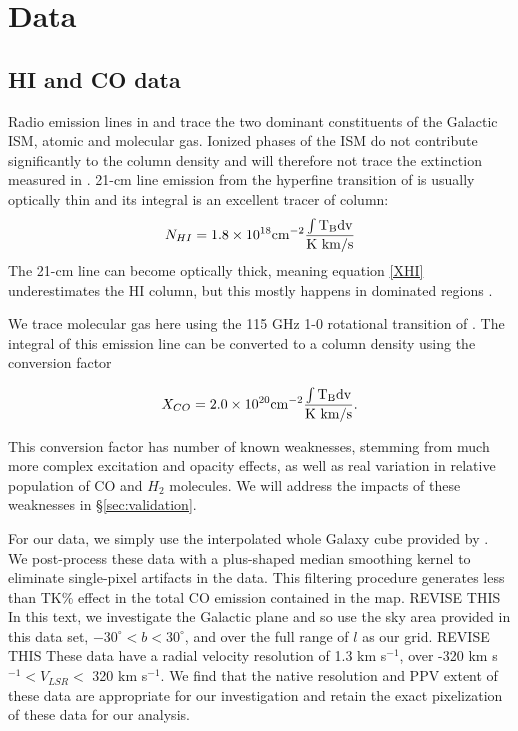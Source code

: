 \section{Data}
\label{sec:data}
\subsection{HI and CO data}

Radio emission lines in \atomHI and \CO trace the two dominant constituents of the Galactic ISM, atomic and molecular gas. Ionized phases of the ISM do not contribute significantly to the column density and will therefore not trace the extinction measured in \cite{Green_2015}. 21-cm line emission from the hyperfine transition of \atomHI is usually optically thin and its integral is an excellent tracer of \atomHI column:
\begin{equation}\label{XHI}
N_{HI} = 1.8 \times 10^{18} \rm cm^{-2} \frac{ \int T_B dv}{\rm K~km/s}
\end{equation}
The 21-cm line can become optically thick, meaning equation \ref{XHI} underestimates the HI column, but this mostly happens in  dominated regions \cite{Goldsmith_2007}. 

We trace molecular gas here using the 115 GHz 1-0 rotational transition of \CO. The integral of this emission line can be converted to a  column density using the conversion factor \citep{Bolatto_2013}

\begin{equation}\label{XCO}
X_{CO} = 2.0 \times 10^{20} \rm cm^{-2} \frac{ \int T_B dv}{\rm K~km/s}.
\end{equation}

This conversion factor has number of known weaknesses, stemming from much more complex excitation and opacity effects, as well as real variation in relative population of CO and $H_2$ molecules. We will address the impacts of these weaknesses in \S \ref{sec:validation}. 

For our \CO data, we simply use the interpolated whole Galaxy cube provided by \cite{Dame_2001}. 
We post-process these data with a plus-shaped median smoothing kernel to eliminate single-pixel artifacts in the data. 
This filtering procedure generates less than TK\% effect in the total CO emission contained in the map. 
REVISE THIS In this text, we investigate the Galactic plane and so use the sky area provided in this data set, $-30^\circ < b < 30^\circ$, and over the full range of $l$ as our grid. REVISE THIS
These data have a radial velocity resolution of 1.3 km s$^{-1}$, over -320 km s$^{-1} < V_{LSR} <$ 320 km s$^{-1}$. 
We find that the native resolution and PPV extent of these data are appropriate for our investigation and retain the exact pixelization of these data for our analysis. 

